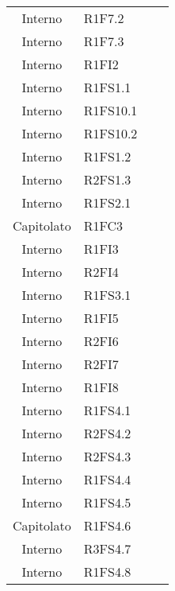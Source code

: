 {\begin{longtable}{ c C{4cm} c c}
Interno & R1F7.2\\

Interno & R1F7.3\\

Interno & R1FI2\\

Interno & R1FS1.1\\

Interno & R1FS10.1\\


Interno & R1FS10.2\\

Interno & R1FS1.2\\

Interno & R2FS1.3\\

Interno & R1FS2.1\\

Capitolato & R1FC3\\

Interno & R1FI3\\

Interno & R2FI4\\

Interno & R1FS3.1\\

Interno & R1FI5\\

Interno & R2FI6\\

Interno & R2FI7\\


Interno & R1FI8\\

Interno & R1FS4.1\\

Interno & R2FS4.2\\

Interno & R2FS4.3\\

Interno & R1FS4.4\\

Interno & R1FS4.5\\

Capitolato & R1FS4.6\\

Interno & R3FS4.7\\

Interno & R1FS4.8\\


\end{longtable}}
